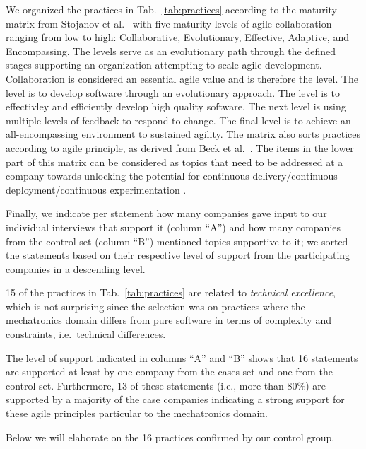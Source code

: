 \documentclass[10pt,a4paper]{IEEEtran} %
\begin{document}
We organized the practices in Tab.~\ref{tab:practices} according to the maturity matrix from Stojanov et al.~\cite{stojanov_maturity_2015} with five maturity
levels of agile collaboration ranging from low to high: Collaborative, Evolutionary, Effective, Adaptive, and Encompassing. 
The levels serve as an evolutionary path through the defined stages supporting an organization attempting to scale agile development. Collaboration is considered an essential agile value and is therefore the  level. The  level is to develop software through an evolutionary approach. The   level is  to  effectivley and efficiently develop high quality software. The next level is using multiple levels of feedback to respond to change. The final  level is to achieve an all-encompassing environment to sustained agility.
The matrix also sorts practices according to
agile principle, as derived from Beck et al.~\cite{beck_manifesto_2001}.
The items in the lower part of this matrix can be considered as topics that need to be addressed at a company towards unlocking the potential for continuous delivery/continuous deployment/continuous experimentation \cite{holmstrom_olsson_climbing_2012}.

Finally, we indicate per statement how many companies gave input to our individual interviews that support it (column ``A'') and how many companies from the control set (column ``B'') mentioned topics supportive to it; we sorted the statements based on their respective level of support from the participating companies in a descending level.

15 of the practices in Tab.~\ref{tab:practices} are related to \emph{technical excellence}, which is not surprising since the selection was on practices where the mechatronics domain differs from pure software in terms of complexity and constraints, i.e.~technical differences. 

The level of support indicated in columns ``A'' and ``B'' shows that 16 statements are supported at least by one company from the cases set and one from the control set.
Furthermore, 13 of these statements (i.e., more than 80\%) are supported by a majority of the case companies indicating a strong support for these agile principles particular to the mechatronics domain.

Below we will elaborate on the 16 practices confirmed by our control group.
\end{document}
